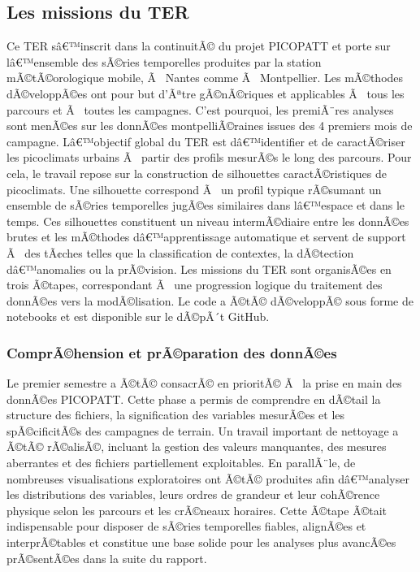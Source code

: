 \documentclass{article}
\begin{document}
\subsection{Les missions du TER}

Ce TER sâ€™inscrit dans la continuitÃ© du projet PICOPATT et porte sur lâ€™ensemble des sÃ©ries temporelles produites par la station mÃ©tÃ©orologique mobile, Ã  Nantes comme Ã  Montpellier. Les mÃ©thodes dÃ©veloppÃ©es ont pour but d'Ãªtre gÃ©nÃ©riques et applicables Ã  tous les parcours et Ã  toutes les campagnes. C'est pourquoi, les premiÃ¨res analyses sont menÃ©es sur les donnÃ©es montpelliÃ©raines issues des 4 premiers mois de campagne. Lâ€™objectif global du TER est dâ€™identifier et de caractÃ©riser les picoclimats urbains Ã  partir des profils mesurÃ©s le long des parcours. Pour cela, le travail repose sur la construction de silhouettes caractÃ©ristiques de picoclimats. Une silhouette correspond Ã  un profil typique rÃ©sumant un ensemble de sÃ©ries temporelles jugÃ©es similaires dans lâ€™espace et dans le temps. Ces silhouettes constituent un niveau intermÃ©diaire entre les donnÃ©es brutes et les mÃ©thodes dâ€™apprentissage automatique et servent de support Ã  des tÃ¢ches telles que la classification de contextes, la dÃ©tection dâ€™anomalies ou la prÃ©vision. Les missions du TER sont organisÃ©es en trois Ã©tapes, correspondant Ã  une progression logique du traitement des donnÃ©es vers la modÃ©lisation.
Le code a Ã©tÃ© dÃ©veloppÃ© sous forme de notebooks et est disponible sur le dÃ©pÃ´t GitHub. \cite{depot-github}

\subsubsection{ComprÃ©hension et prÃ©paration des donnÃ©es}

Le premier semestre a Ã©tÃ© consacrÃ© en prioritÃ© Ã  la prise en main des donnÃ©es PICOPATT. Cette phase a permis de comprendre en dÃ©tail la structure des fichiers, la signification des variables mesurÃ©es et les spÃ©cificitÃ©s des campagnes de terrain. Un travail important de nettoyage a Ã©tÃ© rÃ©alisÃ©, incluant la gestion des valeurs manquantes, des mesures aberrantes et des fichiers partiellement exploitables. En parallÃ¨le, de nombreuses visualisations exploratoires ont Ã©tÃ© produites afin dâ€™analyser les distributions des variables, leurs ordres de grandeur et leur cohÃ©rence physique selon les parcours et les crÃ©neaux horaires. Cette Ã©tape Ã©tait indispensable pour disposer de sÃ©ries temporelles fiables, alignÃ©es et interprÃ©tables et constitue une base solide pour les analyses plus avancÃ©es prÃ©sentÃ©es dans la suite du rapport.
\end{document}
